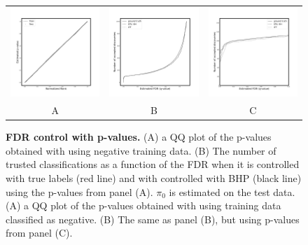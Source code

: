 \documentclass{article}
\begin{document}
\begin{figure}
	\centering
	\begin{tabular}{ccc}
 		\includegraphics[width=2in]{img/cnn_QQ_classical.png} &
		\includegraphics[width=2in]{img/cnn_classical_fdr_control.png} & 
            \includegraphics[width=2in]{img/cnn_classical_fdr_control_loc.png}
		\\
		A & B & C
	\end{tabular}
	\caption{{\bf FDR control with p-values.}
		(A) a QQ plot of the p-values obtained with using negative training data. (B) The number of trusted classifications as a function of the FDR when it is controlled with true labels (red line) and with controlled with BHP (black line) using the p-values from panel (A). $\pi_0$ is estimated on the test data.
		(A) a QQ plot of the p-values obtained with using training data classified as negative. (B) The same as panel (B), but using p-values from panel (C).
	}
	\label{fig:classical}
\end{figure}  
\end{document}
